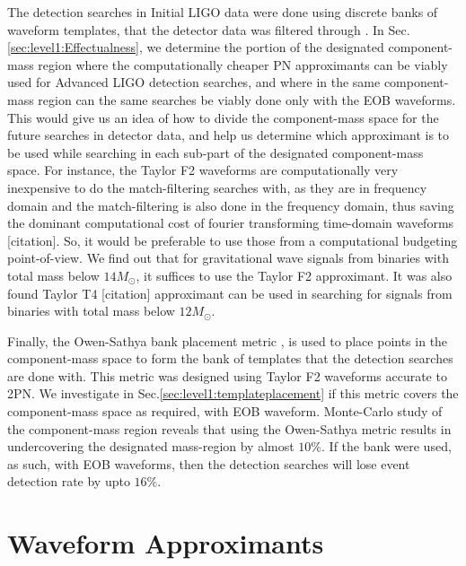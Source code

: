 \documentclass[aps,
prd,
amsmath,
amssymb,
twocolumn,
floatfix,
groupedaddress]{revtex4-1}
\begin{document}
The detection searches in Initial LIGO data were done using discrete banks of waveform templates, that the detector data was filtered through \citep{LSCSearch2004,LSCSearch2005,LSCSearch2008}. In Sec.\ref{sec:level1:Effectualness}, we determine the portion of the designated component-mass region where the computationally cheaper PN approximants can be viably used for Advanced LIGO detection searches, and where in the same component-mass region can the same searches be viably done only with the EOB waveforms. This would give us an idea of how to divide the component-mass space for the future searches in detector data, and help us determine which approximant is to be used while searching in each sub-part of the designated component-mass space. For instance, the Taylor F2 waveforms are computationally very inexpensive to do the match-filtering searches with, as they are in frequency domain and the match-filtering is also done in the frequency domain, thus saving the dominant computational cost of fourier 
transforming time-domain waveforms [citation]. So, it would be preferable to use those from a computational budgeting point-of-view. We find out that for gravitational wave signals from binaries with total mass below $14M_{\odot}$, it suffices to use the Taylor F2 approximant. It was also found Taylor T4 [citation] approximant can be used in searching for signals from binaries with total mass below $12M_{\odot}$.\newline

Finally, the Owen-Sathya bank placement metric \citep{SathyaMetric2PN}\citep{SathyaBankPlacementTauN}, is used to place points in the component-mass space to form the bank of templates that the detection searches are done with. This metric was designed using Taylor F2 waveforms accurate to 2PN. We investigate in Sec.\ref{sec:level1:templateplacement} if this metric covers the component-mass space as required, with EOB waveform. Monte-Carlo study of the component-mass region reveals that using the Owen-Sathya metric results in undercovering the designated mass-region by almost $10\%$. If the bank were used, as such, with EOB waveforms, then the detection searches will lose event detection rate by upto $16\%$.
\section{Waveform Approximants}\label{sec:level1:WaveformApproximants}
\end{document}
